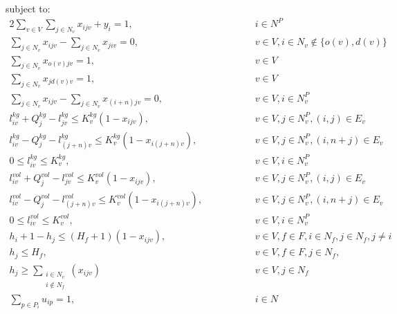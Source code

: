 \documentclass[../main.tex]{subfiles}
\begin{document}
subject to:
\begingroup
    \allowdisplaybreaks
\begin{alignat} {2}
    \sum_{v\in V}\sum_{j\in N_v}x_{ijv} + y_i = 1,	        	&\quad\quad\quad&& 	 i \in N^P 				\label{eq:pickornot} 	\\[4pt]
    \sum_{j\in N_v}x_{ijv} - \sum_{j\in N_v}x_{jiv} = 0,		& 	&&	v \in V, i\in N_v \notin \{o(v), d(v)\}		\label{eq:enterleave} 	\\[4pt]
    \sum_{j\in N_v}x_{o(v)jv} = 1,				        & 	&&	v \in V 					\label{eq:orig}	\\[4pt]
    \sum_{j\in N_v}x_{j d(v)v} = 1,					& 	&&	v \in V 					\label{eq:dest}	\\[4pt]
    \sum_{j\in N_v}x_{ijv} - \sum_{j\in N_v}x_{(i+n)jv} = 0,  	        & 	&&	v \in V, i\in N^P_v 				\label{eq:pickanddeliv}	\\[4pt]
    l_{iv}^{kg} + Q_j^{kg} - l_{jv}^{kg} \leq K_v^{kg}(1-x_{ijv}),      & 	&&	v \in V, j\in N_v^P, (i,j) \in E_v 		\label{eq:weightbeforeafter} 	\\[8pt]
    l_{iv}^{kg} - Q_j^{kg} - l_{(j+n)v}^{kg} \leq K_v^{kg}(1-x_{i(j+n)v}),& 	&&	v \in V ,j\in N_v^P, (i, n+j)\in E_v 		\label{eq:weightpickup}	\\[8pt]
    0 \leq l_{iv}^{kg} \leq K_v^{kg},					& 	&&	v \in V, i \in N^P_v 				\label{eq:weightdeliv}	\\[8pt]
    l_{iv}^{vol} + Q_j^{vol} - l_{jv}^{vol} \leq K_v^{vol}(1-x_{ijv}),      & 	&&	v \in V, j\in N_v^P, (i,j) \in E_v 		\label{eq:weightlim} 	\\[8pt]
    l_{iv}^{vol} - Q_j^{vol} - l_{(j+n)v}^{vol} \leq K_v^{vol}(1-x_{i(j+n)v}),&	&&	v \in V ,j\in N_v^P, (i, n+j)\in E_v 		\label{eq:volpickup}	\\[8pt]
    0 \leq l_{iv}^{vol} \leq K_v^{vol},					& 	&&	v \in V, i \in N^P_v 				\label{eq:voldeliv}	\\[8pt]
    h_{i} + 1 - h_{j} \leq (H_f+1)(1-x_{ijv}),				& 	&&	v \in V, f\in F,  i \in N_f, j \in N_f, j\neq i	\label{eq:13}	\\[4pt]
    h_{j} \leq H_f,                                                     & 	&&	v \in V,f\in F, j\in N_f,  			\label{eq:14}	\\[4pt]
    h_{j} \geq \sum_{\substack{i\in N_v\\i{\notin} N_f}}(x_{ijv})       & 	&&	v \in V, j \in N_f                      	\label{eq:15}	\\[4pt]
    \sum_{p\in P_i} u_{ip} = 1,						& 	&& 	i \in N 					\label{eq:16}	\\[4pt]

\end{alignat}
\end{document}
